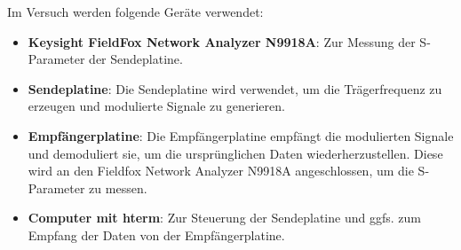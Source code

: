 Im Versuch werden folgende Geräte verwendet:
\begin{itemize}
    \item \textbf{Keysight FieldFox Network Analyzer N9918A}: Zur Messung der S-Parameter der Sendeplatine.
    \item \textbf{Sendeplatine}: Die Sendeplatine wird verwendet, um die Trägerfrequenz zu erzeugen und modulierte Signale zu generieren.
    \item \textbf{Empfängerplatine}: Die Empfängerplatine empfängt die modulierten Signale und demoduliert sie, um die ursprünglichen Daten wiederherzustellen. Diese wird an den Fieldfox Network Analyzer N9918A angeschlossen, um die S-Parameter zu messen.
    \item \textbf{Computer mit hterm}: Zur Steuerung der Sendeplatine und ggfs. zum Empfang der Daten von der Empfängerplatine. 
\end{itemize}
\clearpage